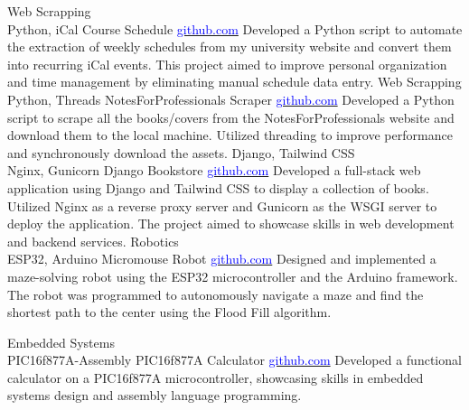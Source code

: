 \documentclass[9pt]{developercv} %
\begin{document}
\begin{entrylist}
    \entry
		{Web Scrapping \\ Python, iCal}
		{Course Schedule}
		{\href{https://github.com/mabushelbaia/Course-Schedule}{\textcolor{blue}{github.com}}}
		{Developed a Python script to automate the extraction of weekly schedules from my university website and convert them into recurring iCal events. This project aimed to improve personal organization and time management by eliminating manual schedule data entry.}
    \entry
        {Web Scrapping \\ Python, Threads}
        {NotesForProfessionals Scraper}
        {\href{https://github.com/mabushelbaia/NotesForProfessionals}{\textcolor{blue}{github.com}}}
        {Developed a Python script to scrape all the books/covers from the NotesForProfessionals website and download them to the local machine. Utilized threading to improve performance and synchronously download the assets.} 
    \entry
        {Django, Tailwind CSS \\ Nginx, Gunicorn}
        {Django Bookstore}
        {\href{https://github.com/mabushelbaia/django-bookstore}{\textcolor{blue}{github.com}}}
        {Developed a full-stack web application using Django and Tailwind CSS to display a collection of books. Utilized Nginx as a reverse proxy server and Gunicorn as the WSGI server to deploy the application. The project aimed to showcase skills in web development and backend services.}
    \entry
        {Robotics\\ ESP32, Arduino}
        {Micromouse Robot}
        {\href{https://github.com/mabushelbaia/Micromouse}{\textcolor{blue}{github.com}}}
        {Designed and implemented a maze-solving robot using the ESP32 microcontroller and the Arduino framework. The robot was programmed to autonomously navigate a maze and find the shortest path to the center using the Flood Fill algorithm.}
        
	\entry
		{Embedded Systems\\ PIC16f877A-Assembly}
		{PIC16f877A Calculator}
		{\href{https://github.com/mabushelbaia/PIC16F877A-Calculator}{\textcolor{blue}{github.com}}}
		{Developed a functional calculator on a PIC16f877A microcontroller, showcasing skills in embedded systems design and assembly language programming.}


\end{entrylist}
\end{document}
